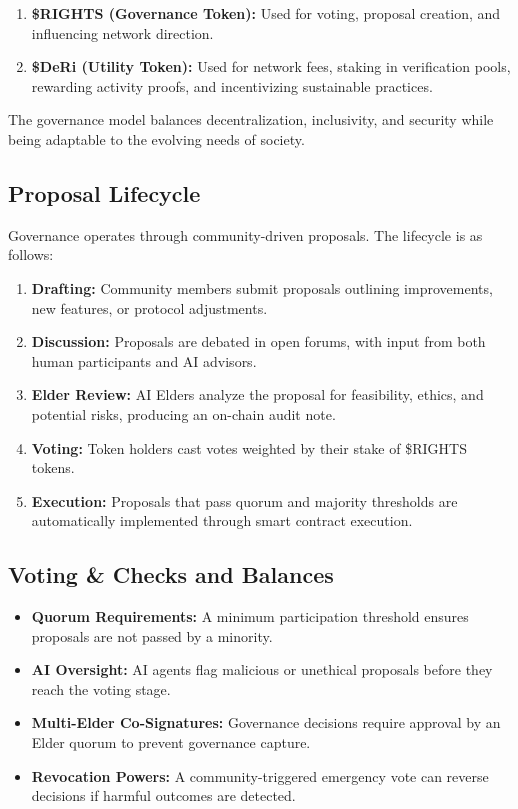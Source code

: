 \documentclass[11pt,a4paper]{article}
\begin{document}
\begin{enumerate}
    \item \textbf{\$RIGHTS (Governance Token):} Used for voting, proposal creation, and influencing network direction.
    \item \textbf{\$DeRi (Utility Token):} Used for network fees, staking in verification pools, rewarding activity proofs, and incentivizing sustainable practices.
\end{enumerate}

The governance model balances decentralization, inclusivity, and security while being adaptable to the evolving needs of society.

\subsection{Proposal Lifecycle}
Governance operates through community-driven proposals. The lifecycle is as follows:
\begin{enumerate}
    \item \textbf{Drafting:} Community members submit proposals outlining improvements, new features, or protocol adjustments.
    \item \textbf{Discussion:} Proposals are debated in open forums, with input from both human participants and AI advisors.
    \item \textbf{Elder Review:} AI Elders analyze the proposal for feasibility, ethics, and potential risks, producing an on-chain audit note.
    \item \textbf{Voting:} Token holders cast votes weighted by their stake of \$RIGHTS tokens.
    \item \textbf{Execution:} Proposals that pass quorum and majority thresholds are automatically implemented through smart contract execution.
\end{enumerate}

\subsection{Voting \& Checks and Balances}
\begin{itemize}
    \item \textbf{Quorum Requirements:} A minimum participation threshold ensures proposals are not passed by a minority.
    \item \textbf{AI Oversight:} AI agents flag malicious or unethical proposals before they reach the voting stage.
    \item \textbf{Multi-Elder Co-Signatures:} Governance decisions require approval by an Elder quorum to prevent governance capture.
    \item \textbf{Revocation Powers:} A community-triggered emergency vote can reverse decisions if harmful outcomes are detected.
\end{itemize}
\end{document}
